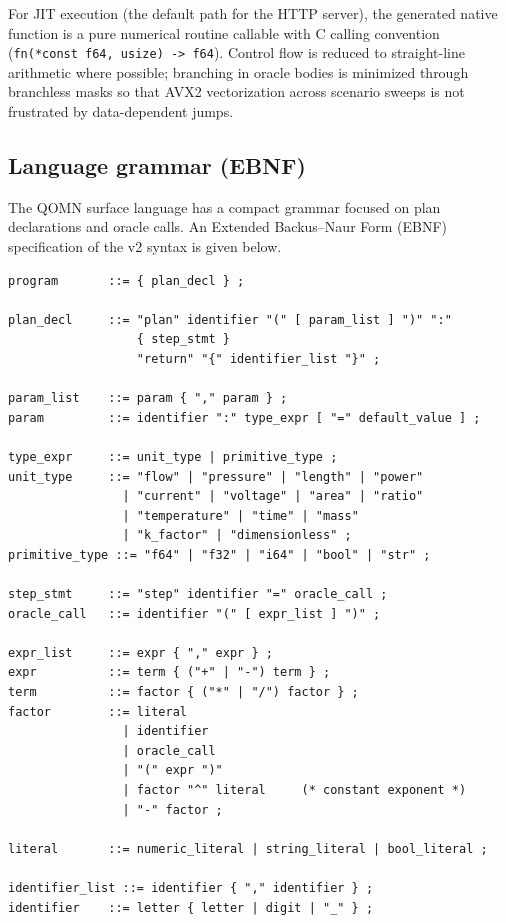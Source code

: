 \documentclass[11pt,a4paper]{article}
\begin{document}
For JIT execution (the default path for the HTTP server), the generated native function is a pure numerical routine callable with C calling convention (\texttt{fn(*const f64, usize) -> f64}). Control flow is reduced to straight-line arithmetic where possible; branching in oracle bodies is minimized through branchless masks so that AVX2 vectorization across scenario sweeps is not frustrated by data-dependent jumps.

\subsection{Language grammar (EBNF)}
\label{sec:grammar}

The QOMN surface language has a compact grammar focused on plan declarations and oracle calls. An Extended Backus--Naur Form (EBNF) specification of the v2 syntax is given below.

\begin{lstlisting}
program       ::= { plan_decl } ;

plan_decl     ::= "plan" identifier "(" [ param_list ] ")" ":"
                  { step_stmt }
                  "return" "{" identifier_list "}" ;

param_list    ::= param { "," param } ;
param         ::= identifier ":" type_expr [ "=" default_value ] ;

type_expr     ::= unit_type | primitive_type ;
unit_type     ::= "flow" | "pressure" | "length" | "power"
                | "current" | "voltage" | "area" | "ratio"
                | "temperature" | "time" | "mass"
                | "k_factor" | "dimensionless" ;
primitive_type ::= "f64" | "f32" | "i64" | "bool" | "str" ;

step_stmt     ::= "step" identifier "=" oracle_call ;
oracle_call   ::= identifier "(" [ expr_list ] ")" ;

expr_list     ::= expr { "," expr } ;
expr          ::= term { ("+" | "-") term } ;
term          ::= factor { ("*" | "/") factor } ;
factor        ::= literal
                | identifier
                | oracle_call
                | "(" expr ")"
                | factor "^" literal     (* constant exponent *)
                | "-" factor ;

literal       ::= numeric_literal | string_literal | bool_literal ;

identifier_list ::= identifier { "," identifier } ;
identifier    ::= letter { letter | digit | "_" } ;
\end{lstlisting}
\end{document}
